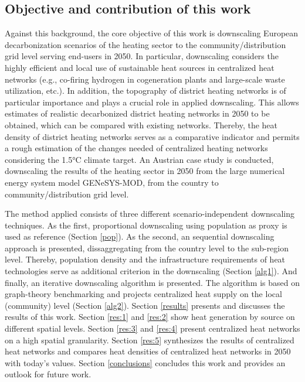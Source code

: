 \subsection{Objective and contribution of this work}
Against this background, the core objective of this work is downscaling European decarbonization scenarios of the heating sector to the community/distribution grid level serving end-users in 2050. In particular, downscaling considers the highly efficient and local use of sustainable heat sources in centralized heat networks (e.g., co-firing hydrogen in cogeneration plants and large-scale waste utilization, etc.). In addition, the topography of district heating networks is of particular importance and plays a crucial role in applied downscaling. This allows estimates of realistic decarbonized district heating networks in 2050 to be obtained, which can be compared with existing networks. Thereby, the heat density of district heating networks serves as a comparative indicator and permits a rough estimation of the changes needed of centralized heating networks considering the 1.5°C climate target. An Austrian case study is conducted, downscaling the results of the heating sector in 2050 from the large numerical energy system model GENeSYS-MOD, from the country to community/distribution grid level.\vspace{0.3cm}

The method applied consists of three different scenario-independent downscaling techniques. As the first, proportional downscaling using population as proxy is used as reference (Section \ref{pop}). As the second, an sequential downscaling approach is presented, dissaggregating from the country level to the sub-region level. Thereby, population density and the infrastructure requirements of heat technologies serve as additional criterion in the downscaling (Section \ref{alg1}). And finally, an iterative downscaling algorithm is presented. The algorithm is based on graph-theory benchmarking and projects centralized heat supply on the local (community) level (Section \ref{alg2}). Section \ref{results} presents and discusses the results of this work. Section \ref{res:1} and \ref{res:2} show heat generation by source on different spatial levels. Section \ref{res:3} and \ref{res:4} present centralized heat networks on a high spatial granularity. Section \ref{res:5} synthesizes the results of centralized heat networks and compares heat densities of centralized heat networks in 2050 with today's values. Section \ref{conclusions} concludes this work and provides an outlook for future work. 



